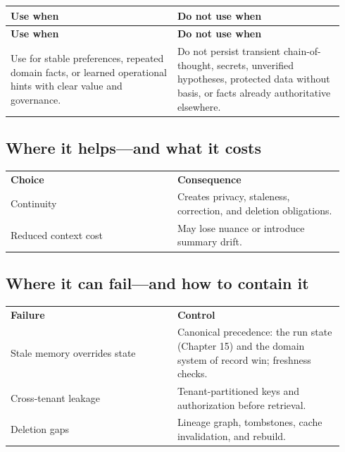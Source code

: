 \BookTableStart
\small
\begin{longtable}{@{}Y{0.4700\linewidth}Y{0.4700\linewidth}@{}}
\color{white}\bfseries \textbf{Use when} & \color{white}\bfseries \textbf{Do not use when} \\
\endfirsthead
{}
\color{white}\bfseries \textbf{Use when} & \color{white}\bfseries \textbf{Do not use when} \\
\endhead
Use for stable preferences, repeated domain facts, or learned operational hints with clear value and governance. & Do not persist transient chain-of-thought, secrets, unverified hypotheses, protected data without basis, or facts already authoritative elsewhere. \\
\end{longtable}
\BookTableEnd

\subsection{Where it helps—and what it costs}

\BookTableStart
\small
\begin{tabular}{@{}Y{0.4700\linewidth}Y{0.4700\linewidth}@{}}
\color{white}\bfseries \textbf{Choice} & \color{white}\bfseries \textbf{Consequence} \\
Continuity & Creates privacy, staleness, correction, and deletion obligations. \\
Reduced context cost & May lose nuance or introduce summary drift. \\
\end{tabular}
\BookTableEnd

\subsection{Where it can fail—and how to contain it}

\BookTableStart
\small
\begin{tabular}{@{}Y{0.4700\linewidth}Y{0.4700\linewidth}@{}}
\color{white}\bfseries \textbf{Failure} & \color{white}\bfseries \textbf{Control} \\
Stale memory overrides state & Canonical precedence: the run state (Chapter 15) and the domain system of record win; freshness checks. \\
Cross-tenant leakage & Tenant-partitioned keys and authorization before retrieval. \\
Deletion gaps & Lineage graph, tombstones, cache invalidation, and rebuild. \\
\end{tabular}
\BookTableEnd

